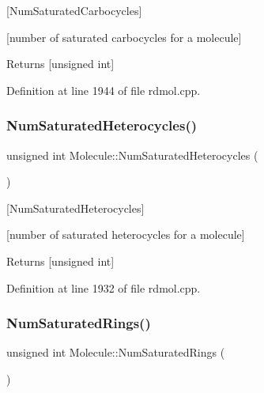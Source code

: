 \mbox{[}Num\+Saturated\+Carbocycles\mbox{]} 

\mbox{[}number of saturated carbocycles for a molecule\mbox{]}

\begin{DoxyReturn}{Returns}
\mbox{[}unsigned int\mbox{]} 
\end{DoxyReturn}


Definition at line 1944 of file rdmol.\+cpp.

\mbox{\label{class_molecule_a9121b878bee7059c7f3eabb541e3c029}} 
\subsubsection{\texorpdfstring{Num\+Saturated\+Heterocycles()}{NumSaturatedHeterocycles()}}
{\footnotesize\ttfamily unsigned int Molecule\+::\+Num\+Saturated\+Heterocycles (\begin{DoxyParamCaption}{ }\end{DoxyParamCaption})}



\mbox{[}Num\+Saturated\+Heterocycles\mbox{]} 

\mbox{[}number of saturated heterocycles for a molecule\mbox{]}

\begin{DoxyReturn}{Returns}
\mbox{[}unsigned int\mbox{]} 
\end{DoxyReturn}


Definition at line 1932 of file rdmol.\+cpp.

\mbox{\label{class_molecule_a0c4eb1ffb0cc048b22a8298e3a9bc951}} 
\subsubsection{\texorpdfstring{Num\+Saturated\+Rings()}{NumSaturatedRings()}}
{\footnotesize\ttfamily unsigned int Molecule\+::\+Num\+Saturated\+Rings (\begin{DoxyParamCaption}{ }\end{DoxyParamCaption})}




